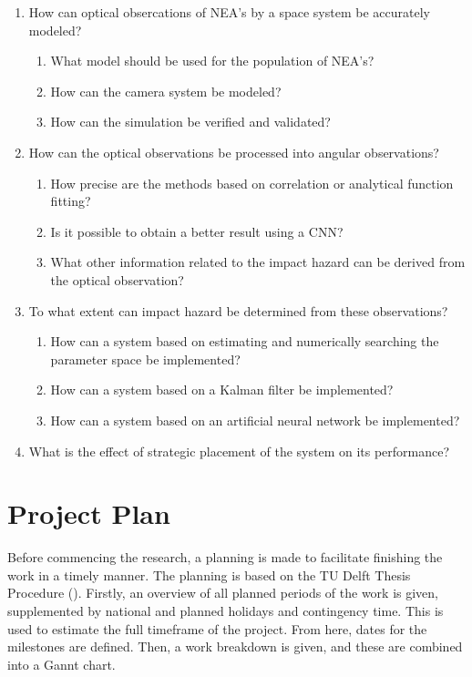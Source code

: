 \begin{enumerate}
    \item How can optical obsercations of NEA's by a space system be accurately modeled?
    \begin{enumerate}
        \item What model should be used for the population of NEA's?
        \item How can the camera system be modeled?
        \item How can the simulation be verified and validated?
    \end{enumerate}
    \item How can the optical observations be processed into angular observations?
    \begin{enumerate}
        \item How precise are the methods based on correlation or analytical function fitting?
        \item Is it possible to obtain a better result using a CNN?
        \item What other information related to the impact hazard can be derived from the optical observation?
    \end{enumerate}
    \item To what extent can impact hazard be determined from these observations?
    \begin{enumerate}
        \item How can a system based on estimating and numerically searching the parameter space be implemented?
        \item How can a system based on a Kalman filter be implemented?
        \item How can a system based on an artificial neural network be implemented?
    \end{enumerate}
    \item What is the effect of strategic placement of the system on its performance?
\end{enumerate}

\section{Project Plan}
\label{sec:plan}
Before commencing the research, a planning is made to facilitate finishing the work in a timely manner. The planning is based on the TU Delft Thesis Procedure (\cite{thesisprocedure}). Firstly, an overview of all planned periods of the work is given, supplemented by national and planned holidays and contingency time. This is used to estimate the full timeframe of the project. From here, dates for the milestones are defined. Then, a work breakdown is given, and these are combined into a Gannt chart. 

